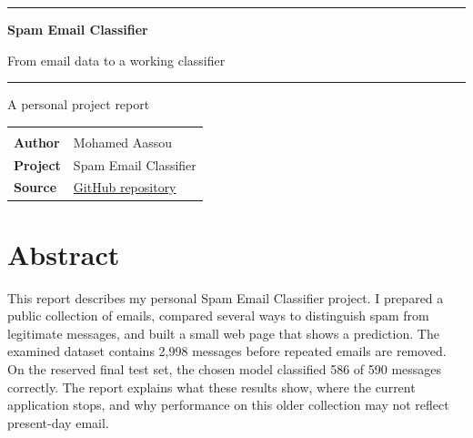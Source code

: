 \documentclass[11pt,a4paper,oneside]{report}
\begin{document}
\hypersetup{pageanchor=false}
\begin{titlepage}
\thispagestyle{cover}
\centering
\vspace*{2.6cm}
{\color{accent}\rule{0.65\textwidth}{1.3pt}}\par\vspace{0.8cm}
{\Huge\bfseries Spam Email Classifier\par}
\vspace{0.4cm}
{\Large From email data to a working classifier\par}
\vspace{0.9cm}
{\color{accent}\rule{0.65\textwidth}{1.3pt}}\par
\vfill
{\large A personal project report\par}
\vspace{1cm}
\renewcommand{\arraystretch}{1.35}
\begin{tabular}{>{\bfseries}p{35mm}p{72mm}}
\rowcolor{headerblue}\multicolumn{2}{c}{\color{white}\bfseries Project details}\\
\rowcolor{rowgray}Author & Mohamed Aassou\\
\rowcolor{white}Project & Spam Email Classifier\\
\rowcolor{rowgray}Source & \href{https://github.com/mohammedaassou/Spam-Email-Classifier}{GitHub repository}\\
\end{tabular}
\vspace*{1.8cm}
\end{titlepage}
\hypersetup{pageanchor=true}
\chapter*{Abstract}
This report describes my personal Spam Email Classifier project. I prepared a public collection of emails, compared several ways to distinguish spam from legitimate messages, and built a small web page that shows a prediction. The examined dataset contains 2,998 messages before repeated emails are removed. On the reserved final test set, the chosen model classified 586 of 590 messages correctly. The report explains what these results show, where the current application stops, and why performance on this older collection may not reflect present-day email.
\tableofcontents
\listoffigures
\clearpage{}








\end{document}
